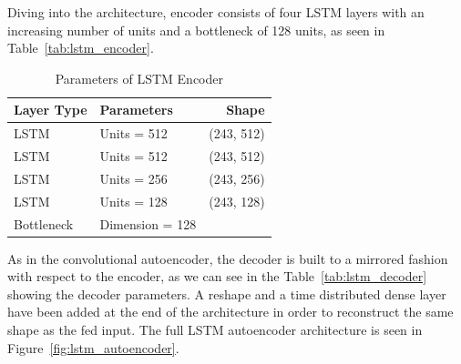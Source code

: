 Diving into the architecture, encoder consists of four LSTM layers with an increasing number of units and a bottleneck of 128 units, as seen in Table~\vref{tab:lstm_encoder}.

\begin{footnotesize}
	\begin{table}
		\centering
		\caption{Parameters of LSTM Encoder}
		\label{tab:lstm_encoder}
		\begin{tabularx}{0.5\textwidth}{XXr}%
			\toprule
			\textbf{Layer Type} & \textbf{Parameters}                                                                   & \textbf{Shape}    \\
			\midrule 
			LSTM               	& Units = 512	                                                                        & (243, 512)        \\[0.25cm] 
			LSTM               	& Units = 512	                                                                        & (243, 512)         \\[0.25cm] 
			LSTM               	& Units = 256	                                                                        & (243, 256)         \\[0.25cm]
			LSTM               	& Units = 128	                                                                        & (243, 128)         \\[0.25cm] 
			Bottleneck          & Dimension = 128	                                                                    &      \\ 
			\bottomrule
		\end{tabularx}
		
	\end{table}
	
\end{footnotesize}

As in the convolutional autoencoder, the decoder is built to a mirrored fashion with respect to the encoder, as we can see in the Table~\vref{tab:lstm_decoder} showing the decoder parameters. A reshape and a time distributed dense layer have been added at the end of the architecture in order to reconstruct the same shape as the fed input. The full LSTM autoencoder architecture is seen in Figure~\vref{fig:lstm_autoencoder}.


